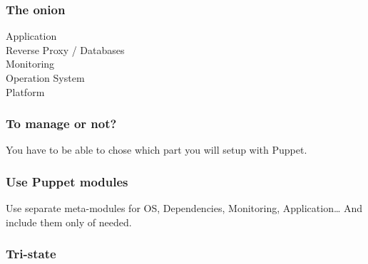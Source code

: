 \begin{frame}
    \frametitle{The onion}
    \huge
    Application\\
    Reverse Proxy / Databases\\
    Monitoring\\
    Operation System\\
    Platform
\end{frame}

\begin{frame}
    \frametitle{To manage or not?}
    \huge You have to be able to chose which part you will setup with Puppet.
\end{frame}
\begin{frame}
    \frametitle{Use Puppet modules}
    \huge Use separate meta-modules for OS, Dependencies, Monitoring, Application\dots{} And include them only of needed.
\end{frame}

\begin{frame}
    \frametitle{Tri-state}


\end{frame}











